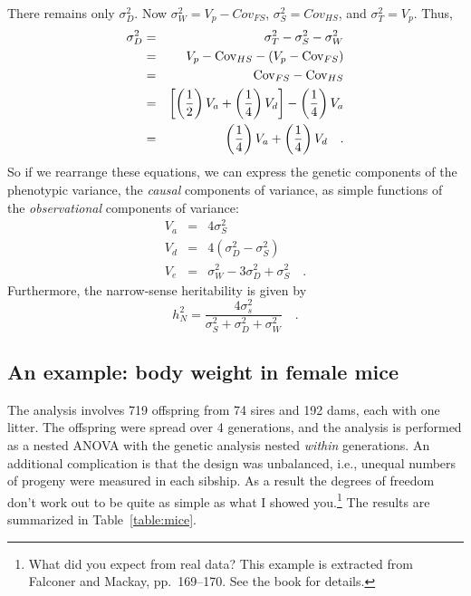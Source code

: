 \documentclass[12pt]{article}
\begin{document}
There remains only $\sigma^2_D$.  Now $\sigma^2_W = V_p - Cov_{FS}$,
$\sigma^2_S = Cov_{HS}$, and $\sigma^2_T = V_p$.  Thus,
\begin{eqnarray*}
\sigma^2_D &=& \sigma^2_T - \sigma^2_S - \sigma^2_W \\
           &=& V_p - \mbox{Cov}_{HS} - (V_p - \mbox{Cov}_{FS}) \\
           &=& \mbox{Cov}_{FS} - \mbox{Cov}_{HS} \\
           &=& \left[
              \left(\frac{1}{2}\right)V_a + \left(\frac{1}{4}\right)V_d
              \right]
              - \left(\frac{1}{4}\right)V_a \\
           &=& \left(\frac{1}{4}\right)V_a +
           \left(\frac{1}{4}\right)V_d \quad .
\end{eqnarray*}
So if we rearrange these equations, we can express the genetic
components of the phenotypic variance, the {\it causal\/} components
of variance, as simple functions of the {\it observational} components
of variance:
\begin{eqnarray*}
V_a &=& 4\sigma^2_S \\
V_d &=& 4(\sigma^2_D - \sigma^2_S) \\
V_e &=& \sigma^2_W - 3\sigma^2_D + \sigma^2_S \quad .
\end{eqnarray*}
Furthermore, the narrow-sense heritability is given by
\[
h^2_N = \frac{4\sigma^2_s}{\sigma^2_S + \sigma^2_D + \sigma^2_W} \quad .
\]

\subsection*{An example: body weight in female mice}

The analysis involves 719 offspring from 74 sires and 192 dams, each
with one litter.  The offspring were spread over 4 generations, and
the analysis is performed as a nested ANOVA with the genetic analysis
nested {\it within\/} generations.  An additional complication is that
the design was unbalanced, i.e., unequal numbers of progeny were
measured in each sibship.  As a result the degrees of freedom don't
work out to be quite as simple as what I showed you.\footnote{What did
you expect from real data? This example is extracted from Falconer and
Mackay, pp.\ 169--170. See the book for details.} The results are
summarized in Table~\ref{table:mice}.
\end{document}
